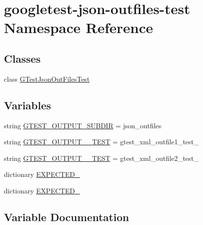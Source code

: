 \hypertarget{namespacegoogletest-json-outfiles-test}{}\section{googletest-\/json-\/outfiles-\/test Namespace Reference}
\label{namespacegoogletest-json-outfiles-test}
\subsection*{Classes}
\begin{DoxyCompactItemize}
\item 
class \mbox{\hyperlink{classgoogletest-json-outfiles-test_1_1_g_test_json_out_files_test}{G\+Test\+Json\+Out\+Files\+Test}}
\end{DoxyCompactItemize}
\subsection*{Variables}
\begin{DoxyCompactItemize}
\item 
string \mbox{\hyperlink{namespacegoogletest-json-outfiles-test_a0f92f4080118c9ed4fce7412abfabf57}{G\+T\+E\+S\+T\+\_\+\+O\+U\+T\+P\+U\+T\+\_\+\+S\+U\+B\+D\+IR}} = \textquotesingle{}json\+\_\+outfiles\textquotesingle{}
\item 
string \mbox{\hyperlink{namespacegoogletest-json-outfiles-test_ace9d5d61931b94cde9f088c67c08089d}{G\+T\+E\+S\+T\+\_\+\+O\+U\+T\+P\+U\+T\+\_\+\_\+\+T\+E\+ST}} = \textquotesingle{}gtest\+\_\+xml\+\_\+outfile1\+\_\+test\+\_\+\textquotesingle{}
\item 
string \mbox{\hyperlink{namespacegoogletest-json-outfiles-test_af99178050ea2a9feaf2d569fcb5c3dae}{G\+T\+E\+S\+T\+\_\+\+O\+U\+T\+P\+U\+T\+\_\+\_\+\+T\+E\+ST}} = \textquotesingle{}gtest\+\_\+xml\+\_\+outfile2\+\_\+test\+\_\+\textquotesingle{}
\item 
dictionary \mbox{\hyperlink{namespacegoogletest-json-outfiles-test_abf0c05f9a69a87f8625d3dd90cc16ed8}{E\+X\+P\+E\+C\+T\+E\+D\+\_}}
\item 
dictionary \mbox{\hyperlink{namespacegoogletest-json-outfiles-test_a4340a105b9ff2d4a132e85a8b6af7d61}{E\+X\+P\+E\+C\+T\+E\+D\+\_}}
\end{DoxyCompactItemize}


\subsection{Variable Documentation}
\mbox{\label{namespacegoogletest-json-outfiles-test_abf0c05f9a69a87f8625d3dd90cc16ed8}} 
